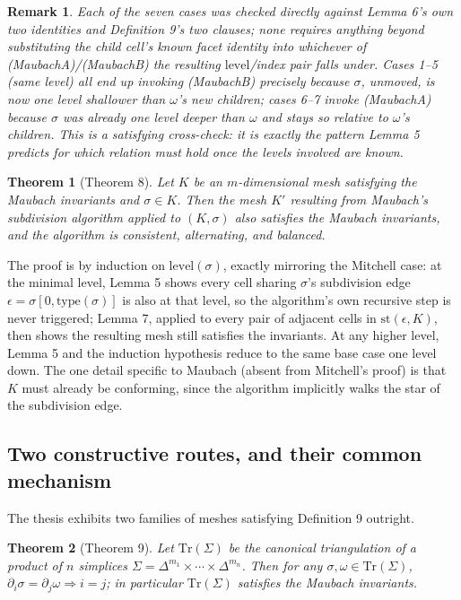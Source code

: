 \documentclass[11pt]{article}
\newtheorem*{thmthm}{Theorem}
\newtheorem*{remthm}{Remark}
\newcommand{\type}{\mathrm{type}}
\newcommand{\level}{\mathrm{level}}
\newcommand{\st}{\mathrm{st}}
\begin{document}
\begin{remthm}
Each of the seven cases was checked directly against Lemma 6's own two
identities and Definition 9's two clauses; none requires anything beyond
substituting the child cell's known facet identity into whichever of
(MaubachA)/(MaubachB) the resulting $\level$/index pair falls under. Cases
1--5 (same level) all end up invoking (MaubachB) precisely because
$\sigma$, unmoved, is now one level \emph{shallower} than $\omega$'s new
children; cases 6--7 invoke (MaubachA) because $\sigma$ was already one
level deeper than $\omega$ and stays so relative to $\omega$'s children.
This is a satisfying cross-check: it is exactly the pattern Lemma 5
predicts for which relation must hold once the levels involved are known.
\end{remthm}

\begin{thmthm}[Theorem 8]
Let $K$ be an $m$-dimensional mesh satisfying the Maubach invariants and
$\sigma\in K$. Then the mesh $K'$ resulting from Maubach's subdivision
algorithm applied to $(K,\sigma)$ also satisfies the Maubach invariants,
and the algorithm is consistent, alternating, and balanced.
\end{thmthm}

The proof is by induction on $\level(\sigma)$, exactly mirroring the
Mitchell case: at the minimal level, Lemma 5 shows every cell sharing
$\sigma$'s subdivision edge $\epsilon=\sigma[0,\type(\sigma)]$ is also at
that level, so the algorithm's own recursive step is never triggered; Lemma
7, applied to every pair of adjacent cells in $\st(\epsilon,K)$, then shows
the resulting mesh still satisfies the invariants. At any higher level,
Lemma 5 and the induction hypothesis reduce to the same base case one level
down. The one detail specific to Maubach (absent from Mitchell's proof) is
that $K$ must already be conforming, since the algorithm implicitly walks
the star of the subdivision edge.

\subsection{Two constructive routes, and their common mechanism}
\label{sec:tworoutes}

The thesis exhibits two families of meshes satisfying Definition 9
outright.

\begin{thmthm}[Theorem 9]
Let $\mathrm{Tr}(\Sigma)$ be the canonical triangulation of a product of
$n$ simplices $\Sigma=\Delta^{m_1}\times\cdots\times\Delta^{m_n}$. Then for
any $\sigma,\omega\in\mathrm{Tr}(\Sigma)$, $\partial_i\sigma=\partial_j\omega
\Rightarrow i=j$; in particular $\mathrm{Tr}(\Sigma)$ satisfies the Maubach
invariants.
\end{thmthm}
\end{document}
